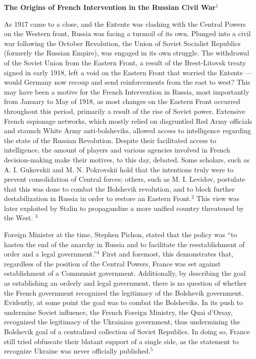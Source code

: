 



\begin{center}

  \textbf{The Origins of French Intervention in the Russian Civil War}$^1$

\end{center}

\begin{justify}

  \hspace{.5in} As 1917 came to a close, and the Entente was clashing with the Central Powers on the Western front, Russia was facing a turmoil of its own. Plunged into a civil war following the October Revolution, the Union of Soviet Socialist Republics (formerly the Russian Empire), was engaged in its own struggle. The withdrawal of the Soviet Union from the Eastern Front, a result of the Brest-Litovsk treaty signed in early 1918, left a void on the Eastern Front that worried the Entente — would Germany now recoup and send reinforcements from the east to west? This may have been a motive for the French Intervention in Russia, most importantly from January to May of 1918, as most changes on the Eastern Front occurred throughout this period, primarily a result of the rise of Soviet power. Extensive French espionage networks, which mostly relied on disgruntled Red Army officials and staunch White Army anti-bolsheviks, allowed access to intelligence regarding the state of the Russian Revolution. Despite their facilitated access to intelligence, the amount of players and various agencies involved in French decision-making make their motives, to this day, debated. Some scholars, such as A. I. Gukovskii and M. N. Pokrovskii hold that the intentions truly were to prevent consolidation of Central forces; others, such as M. I. Levidov, postulate that this was done to combat the Bolshevik revolution, and to block further destabilization in Russia in order to restore an Eastern Front.$^{2}$ This view was later exploited by Stalin to propagandize a more unified country threatened by the West. $^{3}$

  \hspace{.5in} Foreign Minister at the time, Stephen Pichon, stated that the policy was ``to hasten the end of the anarchy in Russia and to facilitate the reestablishment of order and a legal government.''$^{4}$ First and foremost, this demonstrates that, regardless of the position of the Central Powers, France was set against establishment of a Communist government. Additionally, by describing the goal as establishing an orderly and legal government, there is no question of whether the French government recognized the legitimacy of the Bolshevik government. Evidently, at some point the goal was to combat the Bolsheviks. In its push to undermine Soviet influence, the French Foreign Ministry, the Quai d'Orsay, recognized the legitimacy of the Ukrainian government, thus undermining the Bolshevik goal of a centralized collection of Soviet Republics. In doing so, France still tried obfuscate their blatant support of a single side, as the statement to recognize Ukraine was never officially published.$^{5}$


\end{justify}
